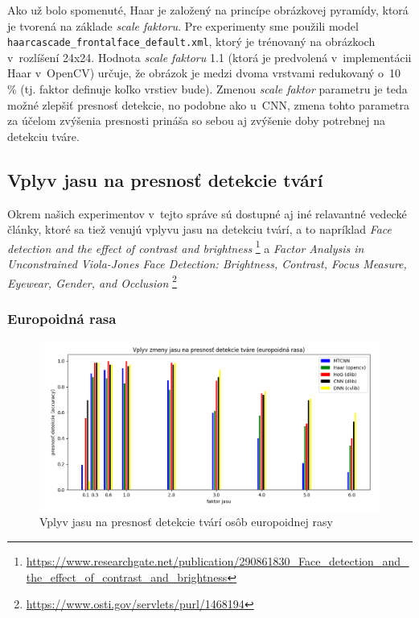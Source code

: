 \documentclass[]{article}
\begin{document}
	Ako už bolo spomenuté, Haar je založený na princípe obrázkovej pyramídy, ktorá je tvorená na základe \textit{scale faktoru}. Pre experimenty sme použili model \texttt{haarcascade\_frontalface\_default.xml}, ktorý je trénovaný na obrázkoch v~rozlíšení 24x24. Hodnota \textit{scale faktoru} 1.1 (ktorá je predvolená v~implementácii Haar v~OpenCV) určuje, že obrázok je medzi dvoma vrstvami redukovaný o~10 \% (tj. faktor definuje koľko vrstiev bude). Zmenou \textit{scale faktor} parametru je teda možné zlepšiť presnosť detekcie, no podobne ako u~CNN, zmena tohto parametra za účelom zvýšenia presnosti prináša so sebou aj zvýšenie doby potrebnej na detekciu tváre. 
	
	\subsection*{Vplyv jasu na presnosť detekcie tvárí}
	
	Okrem našich experimentov v~tejto správe sú dostupné aj iné relavantné vedecké články, ktoré sa tiež venujú vplyvu jasu na detekciu tvárí, a to napríklad \textit{Face detection and the effect of contrast and brightness} \footnote{\url{https://www.researchgate.net/publication/290861830_Face_detection_and_the_effect_of_contrast_and_brightness}} a 
	\textit{Factor Analysis in Unconstrained Viola-Jones Face Detection: Brightness, Contrast, Focus Measure, Eyewear, Gender, and Occlusion} \footnote{\url{https://www.osti.gov/servlets/purl/1468194}}
		
	\subsubsection*{Europoidná rasa}
	
	\begin{figure}[h!]
		\includegraphics[width=\textwidth]{Vysledky_jas/europ/Figure_1.png}
		\caption{Vplyv jasu na presnosť detekcie tvárí osôb europoidnej rasy}
	\end{figure}
\end{document}
